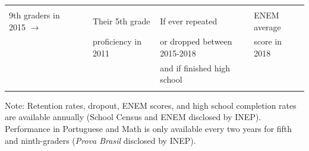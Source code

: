\documentclass[
	article,			%
	12pt,				%
	oneside,			%
	a4paper,			%
	]{article}
\begin{document}
\begin{table}[h!]
\begin{threeparttable}
\begin{tabular}{lllll}
           &            &            &            &            \\

\multicolumn{ 1}{l}{9th graders in 2015 $\rightarrow$} & \multicolumn{ 1}{l}{{\bf }} & Their 5th grade  & If ever repeated  & ENEM average  \\

\multicolumn{ 1}{l}{} & \multicolumn{ 1}{l}{} & proficiency in 2011  & or dropped between 2015-2018 & score in 2018 \\

\multicolumn{ 1}{l}{} &            &            & and if finished high school &            \\
\hline
\hline
\label{tab:inep_data}
\end{tabular}  
\begin{tablenotes}
\fontsize{9}{9}\selectfont 
\item Note: Retention rates, dropout, ENEM scores, and high school completion rates are available annually (School Census and ENEM disclosed by INEP). 
Performance in Portuguese and Math is only available every two years for fifth and ninth-graders (\textit{Prova Brasil} disclosed by INEP).
\end{tablenotes}
\end{threeparttable}    
\end{table}%
\end{document}
